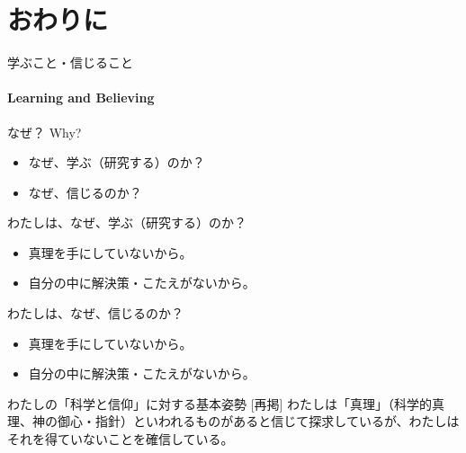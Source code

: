 \documentclass[10pt, dvipdfmx]{beamer}
\begin{document}
\section{おわりに}
\begin{frame}{学ぶこと・信じること}
\framesubtitle{Learning and Believing}

\begin{block}{なぜ？ Why?  }
\begin{itemize}
\item なぜ、学ぶ（研究する）のか？
\item なぜ、信じるのか？
%
\end{itemize}

\end{block}

%
%

\begin{alertblock}{わたしは、なぜ、学ぶ（研究する）のか？}
\begin{itemize}
\item 真理を手にしていないから。
\item 自分の中に解決策・こたえがないから。
\end{itemize}
\end{alertblock}

\begin{alertblock}{わたしは、なぜ、信じるのか？}
\begin{itemize}
\item 真理を手にしていないから。
\item 自分の中に解決策・こたえがないから。
\end{itemize}
\end{alertblock}

\begin{alertblock}{わたしの「科学と信仰」に対する基本姿勢 \hfill [再掲]}
わたしは「真理」（科学的真理、神の御心・指針）といわれるものがあると信じて探求しているが、わたしはそれを得ていないことを確信している。
\end{alertblock}

\end{frame}
\end{document}
